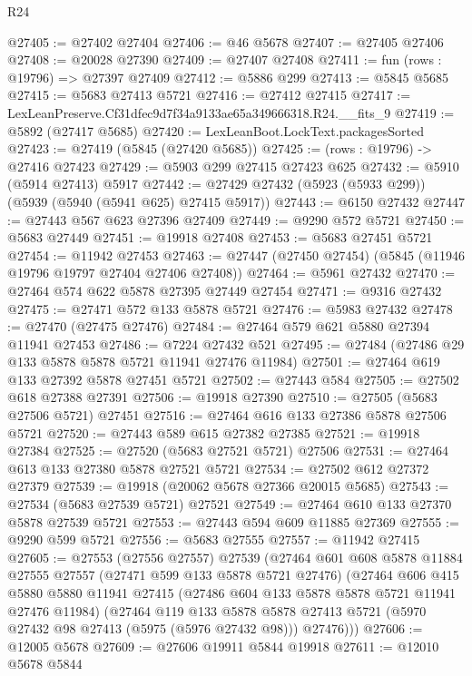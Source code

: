 \begin{lexlean}{R24}
\begin{coremodule}
@27405 := @27402 @27404
@27406 := @46 @5678
@27407 := @27405 @27406
@27408 := @20028 @27390
@27409 := @27407 @27408
@27411 := fun (rows : @19796) => @27397 @27409
@27412 := @5886 @299
@27413 := @5845 @5685
@27415 := @5683 @27413 @5721
@27416 := @27412 @27415
@27417 := LexLeanPreserve.Cf31dfec9d7f34a9133ae65a349666318.R24.__fits_9
@27419 := @5892 (@27417 @5685)
@27420 := LexLeanBoot.LockText.packagesSorted
@27423 := @27419 (@5845 (@27420 @5685))
@27425 := (rows : @19796) -> @27416 @27423
@27429 := @5903 @299 @27415 @27423 @625
@27432 := @5910 (@5914 @27413) @5917
@27442 := @27429 @27432 (@5923 (@5933 @299)) (@5939 (@5940 (@5941 @625) @27415 @5917))
@27443 := @6150 @27432
@27447 := @27443 @567 @623 @27396 @27409
@27449 := @9290 @572 @5721
@27450 := @5683 @27449
@27451 := @19918 @27408
@27453 := @5683 @27451 @5721
@27454 := @11942 @27453
@27463 := @27447 (@27450 @27454) (@5845 (@11946 @19796 @19797 @27404 @27406 @27408))
@27464 := @5961 @27432
@27470 := @27464 @574 @622 @5878 @27395 @27449 @27454
@27471 := @9316 @27432
@27475 := @27471 @572 @133 @5878 @5721
@27476 := @5983 @27432
@27478 := @27470 (@27475 @27476)
@27484 := @27464 @579 @621 @5880 @27394 @11941 @27453
@27486 := @7224 @27432 @521
@27495 := @27484 (@27486 @29 @133 @5878 @5878 @5721 @11941 @27476 @11984)
@27501 := @27464 @619 @133 @27392 @5878 @27451 @5721
@27502 := @27443 @584
@27505 := @27502 @618 @27388 @27391
@27506 := @19918 @27390
@27510 := @27505 (@5683 @27506 @5721) @27451
@27516 := @27464 @616 @133 @27386 @5878 @27506 @5721
@27520 := @27443 @589 @615 @27382 @27385
@27521 := @19918 @27384
@27525 := @27520 (@5683 @27521 @5721) @27506
@27531 := @27464 @613 @133 @27380 @5878 @27521 @5721
@27534 := @27502 @612 @27372 @27379
@27539 := @19918 (@20062 @5678 @27366 @20015 @5685)
@27543 := @27534 (@5683 @27539 @5721) @27521
@27549 := @27464 @610 @133 @27370 @5878 @27539 @5721
@27553 := @27443 @594 @609 @11885 @27369
@27555 := @9290 @599 @5721
@27556 := @5683 @27555
@27557 := @11942 @27415
@27605 := @27553
    (@27556 @27557)
    @27539
    (@27464
      @601
      @608
      @5878
      @11884
      @27555
      @27557
      (@27471 @599 @133 @5878 @5721 @27476)
      (@27464
        @606
        @415
        @5880
        @5880
        @11941
        @27415
        (@27486 @604 @133 @5878 @5878 @5721 @11941 @27476 @11984)
        (@27464
          @119
          @133
          @5878
          @5878
          @27413
          @5721
          (@5970 @27432 @98 @27413 (@5975 (@5976 @27432 @98)))
          @27476)))
@27606 := @12005 @5678
@27609 := @27606 @19911 @5844 @19918
@27611 := @12010 @5678 @5844

\end{coremodule}
\end{lexlean}
